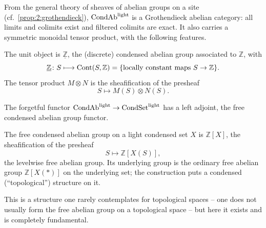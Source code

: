 From the general theory of sheaves of abelian groups on a site (cf.\
\cref{prop:2:grothendieck}), $\mathrm{CondAb}^{\mathrm{light}}$ is a Grothendieck abelian category: all
limits and colimits exist and filtered colimits are exact. It also carries a
symmetric monoidal tensor product, with the following features.

\begin{notation}
\label{not:3:tensor}
The unit object is $\underline{\mathbb{Z}}$, the (discrete) condensed abelian
group associated to $\mathbb{Z}$, with
\begin{equation*}
\underline{\mathbb{Z}}\colon S\longmapsto \operatorname{Cont}(S,\mathbb{Z})
=\{\text{locally constant maps }S\to\mathbb{Z}\}.
\end{equation*}
The tensor product $M\otimes N$ is the sheafification of the presheaf
\begin{equation*}
S\longmapsto M(S)\otimes N(S).
\end{equation*}
\end{notation}

The forgetful functor $\mathrm{CondAb}^{\mathrm{light}}\to\mathrm{CondSet}^{\mathrm{light}}$ has a left adjoint, the free
condensed abelian group functor.

\begin{definition}
\label{def:3:free-group}
The free condensed abelian group on a light condensed set $X$ is
$\mathbb{Z}[X]$, the sheafification of the presheaf
\begin{equation*}
S\longmapsto \mathbb{Z}[X(S)],
\end{equation*}
the levelwise free abelian group. Its underlying group is the ordinary free
abelian group $\mathbb{Z}[X(*)]$ on the underlying set; the construction puts a
condensed (``topological'') structure on it.
\end{definition}

This is a structure one rarely contemplates for topological spaces -- one does
not usually form the free abelian group on a topological space -- but here it
exists and is completely fundamental.


